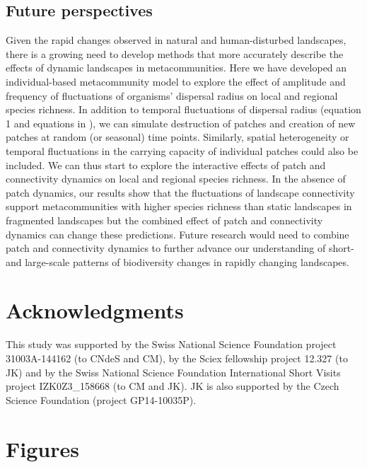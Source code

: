 \documentclass[a4paper,12pt]{article}
\begin{document}
\subsection*{Future perspectives}

Given the rapid changes observed in natural and human-disturbed landscapes, there is a growing need to develop methods that more accurately describe the effects of dynamic landscapes in metacommunities. Here we have developed an individual-based metacommunity model to explore the effect of amplitude and frequency of fluctuations of organisms' dispersal radius on local and regional species richness. In addition to temporal fluctuations of dispersal radius (equation 1 and equations in ), we can simulate destruction of patches and creation of new patches at random (or seasonal) time points. Similarly, spatial heterogeneity or temporal fluctuations in the carrying capacity of individual patches could also be included. We can thus start to explore the interactive effects of patch and connectivity dynamics on local and regional species richness. In the absence of patch dynamics, our results show that the fluctuations of landscape connectivity support metacommunities with higher species richness than static landscapes in fragmented landscapes but the combined effect of patch and connectivity dynamics can change these predictions. Future research would need to combine patch and connectivity dynamics to further advance our understanding of short- and large-scale patterns of biodiversity changes in rapidly changing landscapes. 


\section*{Acknowledgments}

This study was supported by the Swiss National Science Foundation project 31003A-144162 (to CNdeS and CM), by the Sciex fellowship project 12.327 (to JK) and by the Swiss National Science Foundation International Short Visits project IZK0Z3\_158668 (to CM and JK). JK is also supported by the Czech Science Foundation (project GP14-10035P).

\newpage


\newpage

\section*{Figures}
\end{document}

